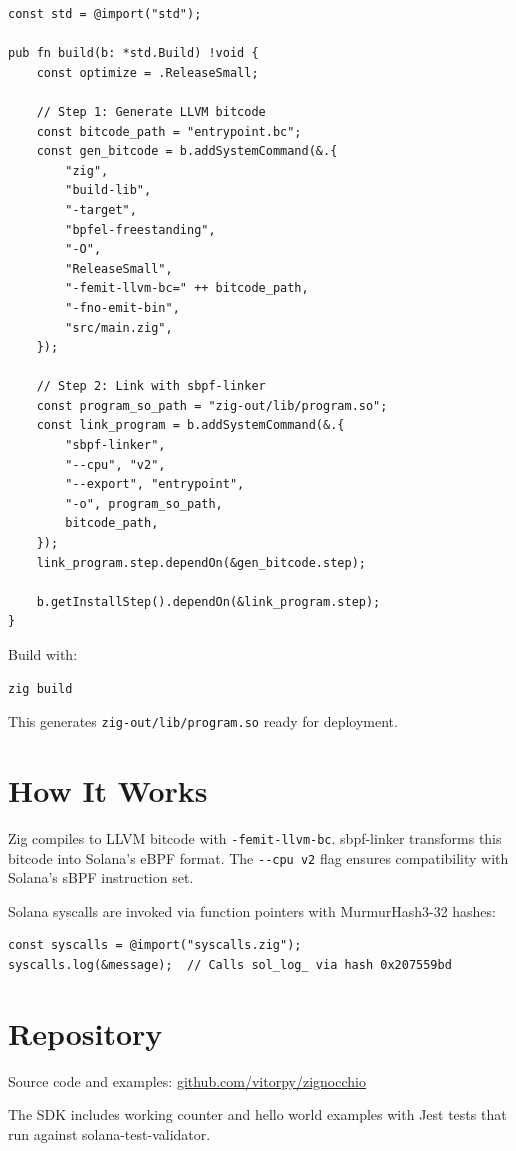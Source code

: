\documentclass{article}
\begin{document}
\begin{verbatim}
const std = @import("std");

pub fn build(b: *std.Build) !void {
    const optimize = .ReleaseSmall;

    // Step 1: Generate LLVM bitcode
    const bitcode_path = "entrypoint.bc";
    const gen_bitcode = b.addSystemCommand(&.{
        "zig",
        "build-lib",
        "-target",
        "bpfel-freestanding",
        "-O",
        "ReleaseSmall",
        "-femit-llvm-bc=" ++ bitcode_path,
        "-fno-emit-bin",
        "src/main.zig",
    });

    // Step 2: Link with sbpf-linker
    const program_so_path = "zig-out/lib/program.so";
    const link_program = b.addSystemCommand(&.{
        "sbpf-linker",
        "--cpu", "v2",
        "--export", "entrypoint",
        "-o", program_so_path,
        bitcode_path,
    });
    link_program.step.dependOn(&gen_bitcode.step);

    b.getInstallStep().dependOn(&link_program.step);
}
\end{verbatim}

Build with:

\begin{verbatim}
zig build
\end{verbatim}

This generates \texttt{zig-out/lib/program.so} ready for deployment.

\section{How It Works}

Zig compiles to LLVM bitcode with \texttt{-femit-llvm-bc}. sbpf-linker transforms this bitcode into Solana's eBPF format. The \texttt{-{}-cpu v2} flag ensures compatibility with Solana's sBPF instruction set.

Solana syscalls are invoked via function pointers with MurmurHash3-32 hashes:

\begin{verbatim}
const syscalls = @import("syscalls.zig");
syscalls.log(&message);  // Calls sol_log_ via hash 0x207559bd
\end{verbatim}

\section{Repository}

Source code and examples: \href{https://github.com/vitorpy/zignocchio}{github.com/vitorpy/zignocchio}

The SDK includes working counter and hello world examples with Jest tests that run against solana-test-validator.


\end{document}

